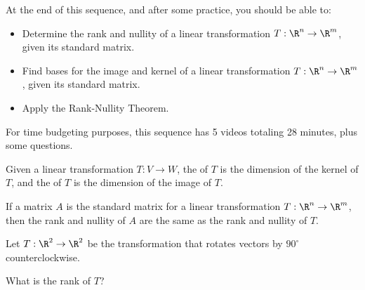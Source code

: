 







At the end of this sequence, and after some practice, you should be able to:

\begin{itemize}
\item Determine the rank and nullity of a linear transformation $T: \R^n \rightarrow \R^m$, given its
standard matrix.
\item Find bases for the image and kernel of  a linear transformation $T: \R^n \rightarrow \R^m$, given its standard matrix.
\item Apply the Rank-Nullity Theorem.  
\end{itemize}


For time budgeting purposes, this sequence has 5 videos totaling 28 minutes, 
plus some questions.  




\endedxtext

\endedxvertical









{}  
Given a linear transformation $T: V\rightarrow W$, the {} of $T$ is the
dimension of the kernel of $T$, and the {} of $T$ is the
dimension of the image of $T$. 

If a matrix $A$ is the standard matrix for a linear transformation $T:\R^n \rightarrow \R^m$, 
then the rank and nullity of $A$ are the same as the rank and nullity of $T$.  


\endedxtext


\endedxvertical






Let $T: \R^2 \rightarrow \R^2$ be the transformation that rotates vectors by $90^\circ$ counterclockwise.

What is the rank of $T$?  



